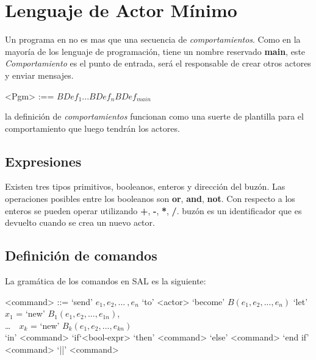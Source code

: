 \chapter{Lenguaje de Actor Mínimo}

Un programa en \SAL no es mas que una secuencia de \textit{comportamientos}.
Como en la mayoría de los lenguaje de programación, tiene un nombre reservado
\textbf{main}, este \textit{Comportamiento} es el punto de entrada, será el
responsable de crear otros actores y enviar mensajes.

\begin{grammar}
   <Pgm> :== $BDef_1 ... BDef_n BDef_{main} $ 
\end{grammar}

la definición de \textit{comportamientos} funcionan como una suerte de plantilla
para el comportamiento que luego tendrán los actores. 

\section{Expresiones}
Existen tres tipos primitivos, booleanos, enteros y dirección del buzón. Las operaciones
posibles entre los booleanos son \textbf{or}, \textbf{and}, \textbf{not}. Con
respecto a los enteros se pueden operar utilizando \textbf{+}, \textbf{-},
\textbf{*}, \textbf{/}.  buzón es un identificador que es devuelto cuando se
crea un nuevo actor.

\section{Definición de comandos}
La gramática de los comandos en SAL es la siguiente:

\begin{grammar}
  <command> ::= `send' $e_1, e_2, \ldots\ , e_n$ `to' <actor>  
  \alt `become' $B(e_1, e_2, ..., e_n)$
  \alt `let' $x_1$ = `new' $B_1(e_1, e_2, ..., e_{1n})$, \\
   \ldots\ \ $x_k$ = `new' $B_k(e_1, e_2, ..., e_{kn})$       \\
  `in' <command> 
  \alt `if`<bool-expr> `then' <command> `else' <command> `end if'
  \alt <command> `||' <command>
\end{grammar}


